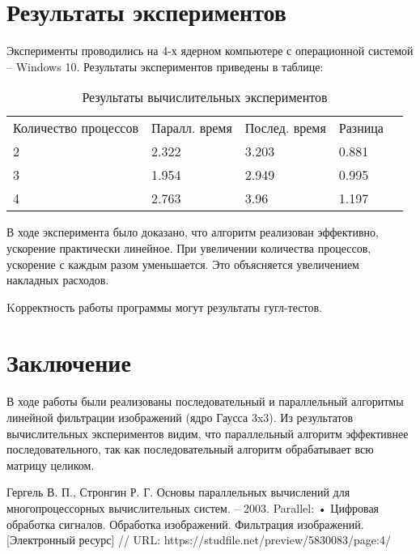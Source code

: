 \documentclass{report}
\begin{document}
\section*{Результаты экспериментов}
Эксперименты проводились на 4-х ядерном компьютере с операционной системой – Windows 10. Результаты экспериментов приведены в таблице:
\begin{table}[!h]
\caption{Результаты вычислительных экспериментов}
\centering
\begin{tabular}{lllll}
Количество процессов & Паралл. время & Послед. время & Разница\\
2  & 2.322 & 3.203 & 0.881\\
3 & 1.954 & 2.949 & 0.995\\
4  & 2.763 & 3.96 & 1.197\\
\end{tabular}
\end{table}
\par
В ходе эксперимента было доказано, что алгоритм реализован эффективно, ускорение практически линейное. При увеличении количества процессов, ускорение с каждым разом уменьшается. Это объясняется увеличением накладных расходов.
\par
Kорректность работы программы могут результаты гугл-тестов.
\newpage

\section*{Заключение}
В ходе работы были реализованы последовательный и параллельный алгоритмы линейной фильтрации изображений (ядро Гаусса 3x3). Из результатов вычислительных экспериментов видим, что параллельный алгоритм эффективнее последовательного, так как последовательный алгоритм обрабатывает всю матрицу целиком.
\newpage

\begin{thebibliography}{1}
Гергель В. П., Стронгин Р. Г. Основы параллельных вычислений для многопроцессорных вычислительных систем. – 2003.
 Parallel: •	Цифровая обработка сигналов. Обработка изображений. Фильтрация изображений. [Электронный ресурс] // URL: https://studfile.net/preview/5830083/page:4/

\end{thebibliography}
\newpage
\end{document}
